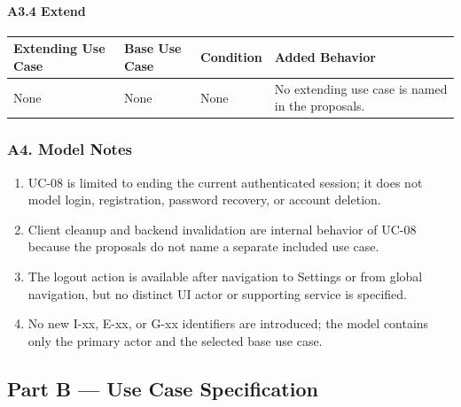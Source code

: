 \documentclass[12pt]{article}
\renewcommand{\baselinestretch}{1.5}
\begin{document}
\hypertarget{sec:a3-4-extend}{}
\paragraph*{A3.4 Extend}
\par\medskip

\begingroup
\small
\renewcommand{\baselinestretch}{1.0}\selectfont
\renewcommand{\arraystretch}{1.15}
\setlength{\tabcolsep}{6pt}
\begin{longtable}{|>{\raggedright\arraybackslash}p{}|>{\raggedright\arraybackslash}p{}|>{\raggedright\arraybackslash}p{}|>{\raggedright\arraybackslash}p{}|}
\hline
\textbf{Extending Use Case} & \textbf{Base Use Case} & \textbf{Condition} & \textbf{Added Behavior} \\ \hline
\endhead
None & None & None & No extending use case is named in the proposals. \\ \hline
\end{longtable}
\endgroup
\par\medskip

\hypertarget{sec:a4-model-notes}{}
\subsubsection*{A4. Model Notes}
\par\medskip

\begin{enumerate}
\item UC-08 is limited to ending the current authenticated session; it does not model login, registration, password recovery, or account deletion.
\item Client cleanup and backend invalidation are internal behavior of UC-08 because the proposals do not name a separate included use case.
\item The logout action is available after navigation to Settings or from global navigation, but no distinct UI actor or supporting service is specified.
\item No new I-xx, E-xx, or G-xx identifiers are introduced; the model contains only the primary actor and the selected base use case.
\end{enumerate}
\par\medskip

\hypertarget{sec:part-b-use-case-specification}{}
\subsection*{Part B --- Use Case Specification}
\par\medskip
\end{document}
